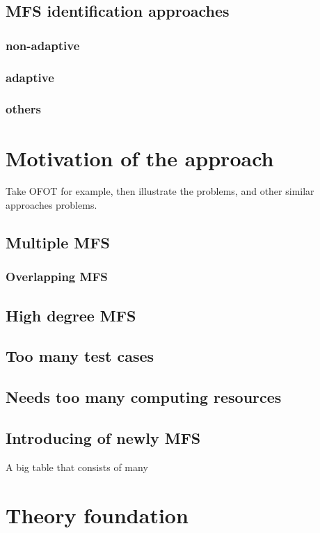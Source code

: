 \documentclass[10pt,journal,cspaper,compsoc]{IEEEtran}
\begin{document}
\subsection{MFS identification approaches}
\subsubsection{non-adaptive}
\subsubsection{adaptive}
\subsubsection{others}

\section{Motivation of the approach}\label{sec:motiv}

Take OFOT for example, then illustrate the problems, and other similar approaches problems.

\subsection{Multiple MFS}
\subsubsection{Overlapping MFS}
\subsection{High degree MFS}
\subsection{Too many test cases}
\subsection{Needs too many computing resources}
\subsection{Introducing of newly MFS}

A big table that consists of many


\section{Theory foundation}\label{sec:propositinon}
\end{document}
